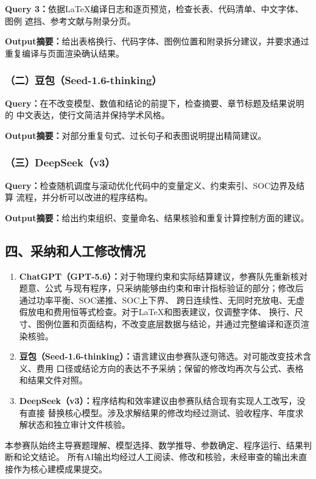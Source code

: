 \noindent\textbf{Query 3：}依据LaTeX编译日志和逐页预览，检查长表、代码清单、中文字体、图例
遮挡、参考文献与附录分页。

\noindent\textbf{Output摘要：}给出表格换行、代码字体、图例位置和附录拆分建议，并要求通过
重复编译与页面渲染确认结果。

\subsubsection*{（二）豆包（Seed-1.6-thinking）}
\noindent\textbf{Query：}在不改变模型、数值和结论的前提下，检查摘要、章节标题及结果说明的
中文表达，使行文简洁并保持学术风格。

\noindent\textbf{Output摘要：}对部分重复句式、过长句子和表图说明提出精简建议。

\subsubsection*{（三）DeepSeek（v3）}
\noindent\textbf{Query：}检查随机调度与滚动优化代码中的变量定义、约束索引、SOC边界及结算
流程，并分析可以改进的程序结构。

\noindent\textbf{Output摘要：}给出约束组织、变量命名、结果核验和重复计算控制方面的建议。

\subsection*{四、采纳和人工修改情况}
\begin{enumerate}[label=（\arabic*）]
  \item \textbf{ChatGPT（GPT-5.6）：}对于物理约束和实际结算建议，参赛队先重新核对题意、公式
  与现有程序，只采纳能够由约束和审计指标验证的部分；修改后通过功率平衡、SOC递推、SOC上下界、
  跨日连续性、无同时充放电、无虚假放电和费用恒等式检查。对于LaTeX和图表建议，仅调整字体、
  换行、尺寸、图例位置和页面结构，不改变底层数据与结论，并通过完整编译和逐页渲染核验。
  \item \textbf{豆包（Seed-1.6-thinking）：}语言建议由参赛队逐句筛选。对可能改变技术含义、费用
  口径或结论方向的表达不予采纳；保留的修改均再次与公式、表格和结果文件对照。
  \item \textbf{DeepSeek（v3）：}程序结构和效率建议由参赛队结合现有实现人工改写，没有直接
  替换核心模型。涉及求解结果的修改均经过测试、验收程序、年度求解状态和独立审计文件核验。
\end{enumerate}

本参赛队始终主导赛题理解、模型选择、数学推导、参数确定、程序运行、结果判断和论文结论。
所有AI输出均经过人工阅读、修改和核验，未经审查的输出未直接作为核心建模成果提交。
